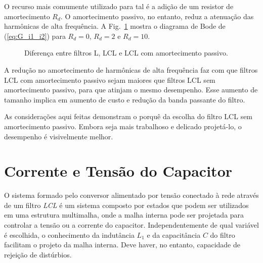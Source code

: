     O recurso mais comumente utilizado para tal é a adição de um resistor de
    amortecimento $R_d$. O amortecimento passivo, no entanto, reduz a atenuação
    das harmônicas de alta frequência. A Fig.~\ref{fig:R_in_LCL} mostra o diagrama
    de Bode de (\ref{eq:G_i1_i2}) para $R_d = 0$, $R_d = 2$ e $R_d = 10$.

    \begin{figure}[htb]
        \caption{Diferença entre filtros L, LCL e LCL com amortecimento passivo.}
        \label{fig:R_in_LCL}
    \end{figure}

    A redução no amortecimento de harmônicas de alta frequência faz com que filtros
    LCL com amortecimento passivo sejam maiores que filtros LCL sem amortecimento
    passivo, para que atinjam o mesmo desempenho. Esse aumento de tamanho implica
    em aumento de custo e redução da banda passante do filtro.

    As considerações aqui feitas demonstram o porquê da escolha do filtro LCL sem
    amortecimento passivo. Embora seja mais trabalhoso e delicado projetá-lo,
    o desempenho é visivelmente melhor.


\section{Corrente e Tensão do Capacitor}

    O sistema formado pelo conversor alimentado por tensão conectado à rede através
    de um filtro \textit{LCL} é um sistema composto por estados que podem ser
    utilizados em uma estrutura multimalha, onde a malha interna pode ser projetada
    para controlar a tensão ou a corrente do capacitor. Independentemente de qual
    variável é escolhida, o conhecimento da indutância $L_1$ e da capacitância $C$
    do filtro facilitam o projeto da malha interna. Deve haver, no entanto, capacidade
    de rejeição de distúrbios.

